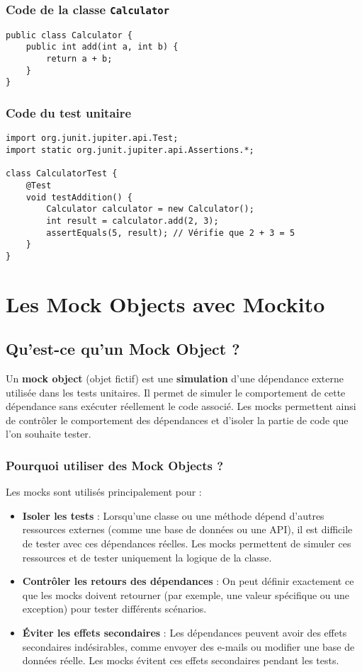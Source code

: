 \documentclass[12pt,a4paper]{article}
\begin{document}
\subsubsection{Code de la classe \texttt{Calculator}}
\begin{lstlisting}
public class Calculator {
    public int add(int a, int b) {
        return a + b;
    }
}
\end{lstlisting}

\subsubsection{Code du test unitaire}
\begin{lstlisting}
import org.junit.jupiter.api.Test;
import static org.junit.jupiter.api.Assertions.*;

class CalculatorTest {
    @Test
    void testAddition() {
        Calculator calculator = new Calculator();
        int result = calculator.add(2, 3);
        assertEquals(5, result); // Vérifie que 2 + 3 = 5
    }
}
\end{lstlisting}

\newpage

\section{Les Mock Objects avec Mockito}
\subsection{Qu'est-ce qu'un Mock Object ?}
Un \textbf{mock object} (objet fictif) est une \textbf{simulation} d'une dépendance externe utilisée dans les tests unitaires. Il permet de simuler le comportement de cette dépendance sans exécuter réellement le code associé. Les mocks permettent ainsi de contrôler le comportement des dépendances et d'isoler la partie de code que l'on souhaite tester.

\subsubsection{Pourquoi utiliser des Mock Objects ?}
Les mocks sont utilisés principalement pour :
\begin{itemize}
    \item \textbf{Isoler les tests} : Lorsqu'une classe ou une méthode dépend d'autres ressources externes (comme une base de données ou une API), il est difficile de tester avec ces dépendances réelles. Les mocks permettent de simuler ces ressources et de tester uniquement la logique de la classe.
    \item \textbf{Contrôler les retours des dépendances} : On peut définir exactement ce que les mocks doivent retourner (par exemple, une valeur spécifique ou une exception) pour tester différents scénarios.
    \item \textbf{Éviter les effets secondaires} : Les dépendances peuvent avoir des effets secondaires indésirables, comme envoyer des e-mails ou modifier une base de données réelle. Les mocks évitent ces effets secondaires pendant les tests.
\end{itemize}
\end{document}
